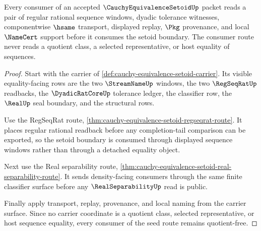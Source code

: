 \begin{theorem}
\label{thm:cauchy-equivalence-setoid-seed-closure-route}
Every consumer of an accepted $\CauchyEquivalenceSetoidUp$ packet reads a pair of regular rational sequence windows, dyadic tolerance witnesses, componentwise $\hsame$ transport, displayed replay, $\Pkg$ provenance, and local $\NameCert$ support before it consumes the setoid boundary. The consumer route never reads a quotient class, a selected representative, or host equality of sequences.
\end{theorem}
\begin{proof}
Start with the carrier of \autoref{def:cauchy-equivalence-setoid-carrier}. Its visible equality-facing rows are the two $\StreamNameUp$ windows, the two $\RegSeqRatUp$ readbacks, the $\DyadicRatCoreUp$ tolerance ledger, the classifier row, the $\RealUp$ seal boundary, and the structural rows.

Use the RegSeqRat route, \autoref{thm:cauchy-equivalence-setoid-regseqrat-route}. It places regular rational readback before any completion-tail comparison can be exported, so the setoid boundary is consumed through displayed sequence windows rather than through a detached equality object.

Next use the Real separability route, \autoref{thm:cauchy-equivalence-setoid-real-separability-route}. It sends density-facing consumers through the same finite classifier surface before any $\RealSeparabilityUp$ read is public.

Finally apply transport, replay, provenance, and local naming from the carrier surface. Since no carrier coordinate is a quotient class, selected representative, or host sequence equality, every consumer of the seed route remains quotient-free.
\end{proof}

